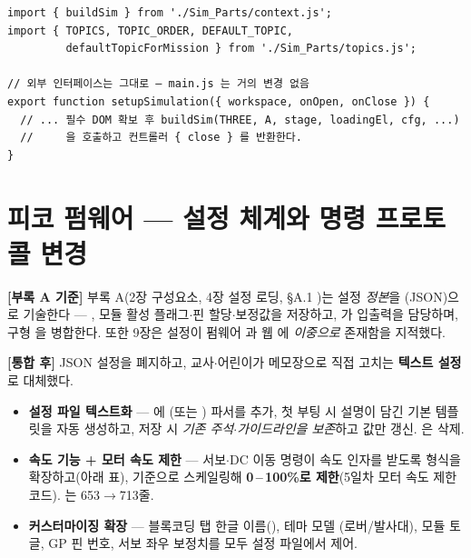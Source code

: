 \begin{verbatim}
import { buildSim } from './Sim_Parts/context.js';
import { TOPICS, TOPIC_ORDER, DEFAULT_TOPIC,
         defaultTopicForMission } from './Sim_Parts/topics.js';

// 외부 인터페이스는 그대로 — main.js 는 거의 변경 없음
export function setupSimulation({ workspace, onOpen, onClose }) {
  // ... 필수 DOM 확보 후 buildSim(THREE, A, stage, loadingEl, cfg, ...)
  //     을 호출하고 컨트롤러 { close } 를 반환한다.
}
\end{verbatim}

\section{피코 펌웨어 --- 설정 체계와 명령 프로토콜 변경}
\textbf{[부록 A 기준]} 부록 A(2장 구성요소, 4장 설정 로딩, \S A.1 )는
설정 \emph{정본}을 (JSON)으로 기술한다 --- ,
모듈 활성 플래그$\cdot$핀 할당$\cdot$보정값을 저장하고, 가 입출력을
담당하며, 구형 을 병합한다. 또한 9장은 설정이 펌웨어
과 웹 에 \emph{이중으로} 존재함을 지적했다.

\smallskip
\noindent\textbf{[통합 후]} JSON 설정을 폐지하고, 교사$\cdot$어린이가 메모장으로 직접 고치는
\textbf{텍스트 설정 }로 대체했다.
\begin{itemize}
  \item \textbf{설정 파일 텍스트화} --- 에 (또는
  ) 파서를 추가, 첫 부팅 시 설명이 담긴 기본 템플릿을 자동 생성하고,
  저장 시 \emph{기존 주석$\cdot$가이드라인을 보존}하고 값만 갱신. 은 삭제.
  \item \textbf{속도 기능 + 모터 속도 제한} --- 서보$\cdot$DC 이동 명령이 속도 인자를 받도록
  형식을 확장하고(아래 표),  기준으로 스케일링해 \textbf{0\,--\,100\%로
  제한}(5일차 모터 속도 제한 코드). 는 653$\to$713줄.
  \item \textbf{커스터마이징 확장} --- 블록코딩 탭 한글 이름(), 테마 모델
  (로버/발사대), 모듈 토글, GP 핀 번호, 서보 좌우 보정치를 모두 설정 파일에서 제어.
\end{itemize}

